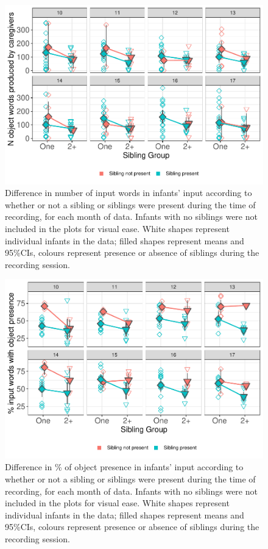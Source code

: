 \documentclass[
  man,mask,floatsintext]{apa6}
\begin{document}
\begin{figure}
\centering
\includegraphics{SiblingsStudyText-anon-revisions_files/figure-latex/figure-sibpresence-input-1.pdf}
\caption{\label{fig:figure-sibpresence-input}Difference in number of input words in infants' input according to whether or not a sibling or siblings were present during the time of recording, for each month of data. Infants with no siblings were not included in the plots for visual ease. White shapes represent individual infants in the data; filled shapes represent means and 95\%CIs, colours represent presence or absence of siblings during the recording session.}
\end{figure}

\begin{figure}
\centering
\includegraphics{SiblingsStudyText-anon-revisions_files/figure-latex/figure-sibpresence-obj-1.pdf}
\caption{\label{fig:figure-sibpresence-obj}Difference in \% of object presence in infants' input according to whether or not a sibling or siblings were present during the time of recording, for each month of data. Infants with no siblings were not included in the plots for visual ease. White shapes represent individual infants in the data; filled shapes represent means and 95\%CIs, colours represent presence or absence of siblings during the recording session.}
\end{figure}
\end{document}
